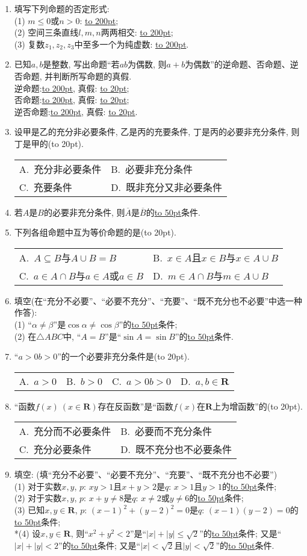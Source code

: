 \documentclass[10pt,a4paper]{article}
\newcommand{\blank}[1]{\underline{\hbox to #1pt{}}}
\newcommand{\bracket}[1]{(\hbox to #1pt{})}
\newcommand{\twoch}[4]{\par\begin{tabular}{p{.46\textwidth}p{.46\textwidth}}
A.~#1& B.~#2\\
C.~#3& D.~#4
\end{tabular}}
\newcommand{\fourch}[4]{\par\begin{tabular}{p{.23\textwidth}p{.23\textwidth}p{.23\textwidth}p{.23\textwidth}}
A.~#1 &B.~#2& C.~#3& D.~#4
\end{tabular}}
\begin{document}
\begin{enumerate}[1.]
\item 填写下列命题的否定形式:\\
(1) $m\le 0$或$n>0$: \blank{200};\\
(2) 空间三条直线$l,m,n$两两相交: \blank{200};\\
(3) 复数$z_1,z_2,z_3$中至多一个为纯虚数: \blank{200}.
\item 已知$a,b$是整数, 写出命题``若$ab$为偶数, 则$a+b$为偶数''的逆命题、否命题、逆否命题, 并判断所写命题的真假.\\
逆命题:\blank{200}, 真假: \blank{20};\\
否命题:\blank{200}, 真假: \blank{20};\\
逆否命题:\blank{200}, 真假: \blank{20}.
\item 设甲是乙的充分非必要条件, 乙是丙的充要条件, 丁是丙的必要非充分条件, 则丁是甲的\bracket{20}.
\twoch{充分非必要条件}{必要非充分条件}{充要条件}{既非充分又非必要条件}
\item 若$A$是$B$的必要非充分条件, 则$\overline{A}$是$\overline{B}$的\blank{50}条件.  
\item 下列各组命题中互为等价命题的是\bracket{20}.
\twoch{$A\subseteq B$与$A\cup B=B$}{$x\in A$且$x\in B$与$x\in A\cup B$}{$a\in A\cap B$与$a\in A$或$a\in B$}{$m\in A\cap B$与$m\in A\cup B$}
\item 填空(在``充分不必要''、``必要不充分''、``充要''、``既不充分也不必要''中选一种作答):\\
(1) ``$\alpha \ne \beta$''是$\cos \alpha \ne \cos \beta$''的\blank{50}条件;\\
(2) 在$\triangle ABC$中, ``$A=B$''是``$\sin A=\sin B$''的\blank{50}条件.
\item ``$a>0b>0$''的一个必要非充分条件是\bracket{20}.
\fourch{$a>0$}{$b>0$}{$a>0b>0$}{$a,b\in \mathbf{R}$}
\item ``函数$f(x)\ (x\in \mathbf{R})$存在反函数''是``函数$f(x)$在$\mathbf{R}$上为增函数''的\bracket{20}.
\twoch{充分而不必要条件}{必要而不充分条件}{充分必要条件}{既不充分也不必要条件}
\item 填空: (填``充分不必要''、``必要不充分''、``充要''、``既不充分也不必要'')\\ 
(1) 对于实数$x,y$, $p$: $xy>1$且$x+y>2$是$q$: $x>1$且$y>1$的\blank{50}条件;\\
(2) 对于实数$x,y$, $p$: $x+y\ne 8$是$q$: $x\ne 2$或$y\ne 6$的\blank{50}条件;\\
(3) 已知$x,y\in \mathbf{R}$, $p$: $(x-1)^2+(y-2)^2=0$是$q$: $(x-1)(y-2)=0$的\blank{50}条件;\\
*(4) 设$x,y\in \mathbf{R}$, 则``$x^2+y^2<2$''是``$|x|+|y|\le \sqrt2$''的\blank{50}条件; 又是``$|x|+|y|<2$''的\blank{50}条件; 又是``$|x|<\sqrt2$且$|y|<\sqrt2$''的\blank{50}条件.\\

\end{enumerate}
\end{document}
